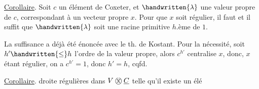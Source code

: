 \uline{Corollaire}. Soit $c$ un élément de Coxeter, et $\handwritten{\lambda}$ une valeur propre de $c$, correspondant à un vecteur propre $x$. Pour que $x$ soit régulier, il faut et il suffit que $\handwritten{\lambda}$ soit une racine primitive $h$.ème de $1$.
\begingroup\reversemarginpar
{}
\endgroup

La suffisance a déjà été énoncée avec le th. de Kostant. Pour la nécessité, soit $h'\handwritten{\leq}h$ l'ordre de la valeur propre, alors $c^{h'}$ centralise $x$, donc, $x$ étant régulier, on a $c^{h'}=1$, donc $h'=h$, cqfd.

\uline{Corollaire}.   droite régulières dans $V\mathbin{\text{\textcircled{x}}}\underline{C}$ telle qu'il existe un élé%
